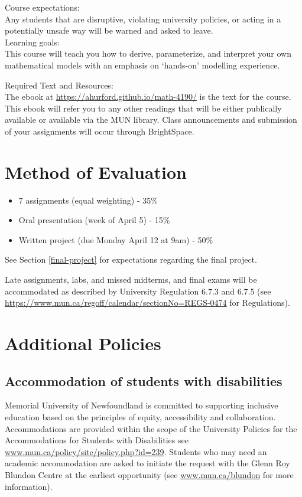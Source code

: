 \documentclass[]{book}
\providecommand{\tightlist}{%
  \setlength{\itemsep}{0pt}\setlength{\parskip}{0pt}}
\begin{document}
Course expectations:\\
Any students that are disruptive, violating university policies, or
acting in a potentially unsafe way will be warned and asked to
leave.\\[2\baselineskip]Learning goals:\\
This course will teach you how to derive, parameterize, and interpret
your own mathematical models with an emphasis on `hands-on' modelling
experience.

Required Text and Resources:\\
The ebook at \url{https://ahurford.github.io/math-4190/} is the text for
the course. This ebook will refer you to any other readings that will be
either publically available or available via the MUN library. Class
announcements and submission of your assignments will occur through
BrightSpace.

\section{Method of Evaluation}\label{method-of-evaluation}

\begin{itemize}
\tightlist
\item
  7 assignments (equal weighting) - 35\%
\item
  Oral presentation (week of April 5) - 15\%
\item
  Written project (due Monday April 12 at 9am) - 50\%
\end{itemize}

See Section \ref{final-project} for expectations regarding the final
project.

Late assignments, labs, and missed midterms, and final exams will be
accommodated as described by University Regulation 6.7.3 and 6.7.5 (see
\url{https://www.mun.ca/regoff/calendar/sectionNo=REGS-0474} for
Regulations).

\section{Additional Policies}\label{additional-policies}

\subsection{Accommodation of students with
disabilities}\label{accommodation-of-students-with-disabilities}

Memorial University of Newfoundland is committed to supporting inclusive
education based on the principles of equity, accessibility and
collaboration. Accommodations are provided within the scope of the
University Policies for the Accommodations for Students with
Disabilities see \url{www.mun.ca/policy/site/policy.php?id=239}.
Students who may need an academic accommodation are asked to initiate
the request with the Glenn Roy Blundon Centre at the earliest
opportunity (see \url{www.mun.ca/blundon} for more information).
\end{document}
